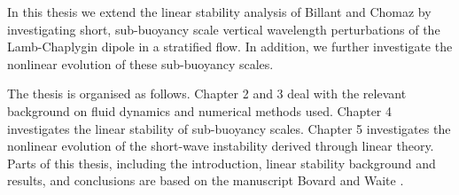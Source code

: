 In this thesis we extend the linear stability analysis of Billant and Chomaz \cite{bc2000c} by investigating short, sub-buoyancy scale vertical wavelength perturbations of the Lamb-Chaplygin dipole in a stratified flow. In addition, we further investigate the nonlinear evolution of these sub-buoyancy scales. 

The thesis is organised as follows. Chapter 2 and 3 deal with the relevant background on fluid dynamics and numerical methods used. Chapter 4 investigates the linear stability of sub-buoyancy scales. Chapter 5 investigates the nonlinear evolution of the short-wave instability derived through linear theory. Parts of this thesis, including the introduction, linear stability background and results, and conclusions are based on the manuscript Bovard and Waite \cite{bovard2013}.



